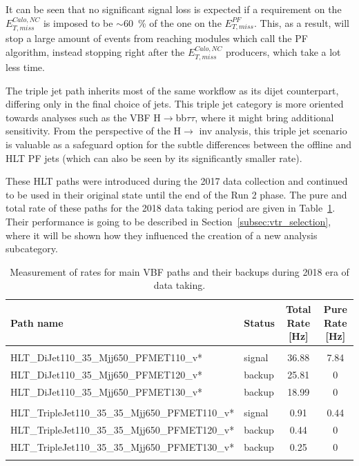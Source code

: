 It can be seen that no significant signal loss is expected if a requirement on the $E^{Calo, NC}_{T,miss}$ is imposed to be $\sim$60~\% of the one on the $E^{PF}_{T,miss}$. This, as a result, will stop a large amount of events from reaching modules which call the PF algorithm, instead stopping right after the $E^{Calo, NC}_{T,miss}$ producers, which take a lot less time.

\hspace{10pt} The triple jet path inherits most of the same workflow as its dijet counterpart, differing only in the final choice of jets. This triple jet category is more oriented towards analyses such as the VBF H$\rightarrow$bb$\tau\tau$, where it might bring additional sensitivity. From the perspective of the H$\rightarrow$ inv analysis, this triple jet scenario is valuable as a safeguard option for the subtle differences between the offline and HLT PF jets (which can also be seen by its significantly smaller rate).

\hspace{10pt} These HLT paths were introduced during the 2017 data collection and continued to be used in their original state until the end of the Run 2 phase. The pure and total rate of these paths for the 2018 data taking period are given in Table~\ref{tab:hlt_rates}. Their performance is going to be described in Section~\ref{subsec:vtr_selection}, where it will be shown how they influenced the creation of a new analysis subcategory.

\begin{table}[htbp]
    \centering
    \footnotesize
    \begin{tabular}{llcc}
     Path name & Status &Total Rate [Hz] & Pure Rate [Hz] \\   \hline\hline
           & & & \\
      HLT\_DiJet110\_35\_Mjj650\_PFMET110\_v*   &  signal & 36.88 & 7.84\\
      HLT\_DiJet110\_35\_Mjj650\_PFMET120\_v*   &  backup & 25.81 &  0 \\
      HLT\_DiJet110\_35\_Mjj650\_PFMET130\_v*   &  backup & 18.99 &  0\\
      & & &\\
      HLT\_TripleJet110\_35\_35\_Mjj650\_PFMET110\_v* & signal & 0.91 & 0.44 \\
      HLT\_TripleJet110\_35\_35\_Mjj650\_PFMET120\_v* & backup & 0.44 & 0\\
      HLT\_TripleJet110\_35\_35\_Mjj650\_PFMET130\_v* & backup & 0.25 & 0\\
      & & & \\\hline\hline
    \end{tabular}
    \caption{Measurement of rates for main VBF paths and their backups during 2018 era of data taking.}
    \label{tab:hlt_rates}
\end{table}

